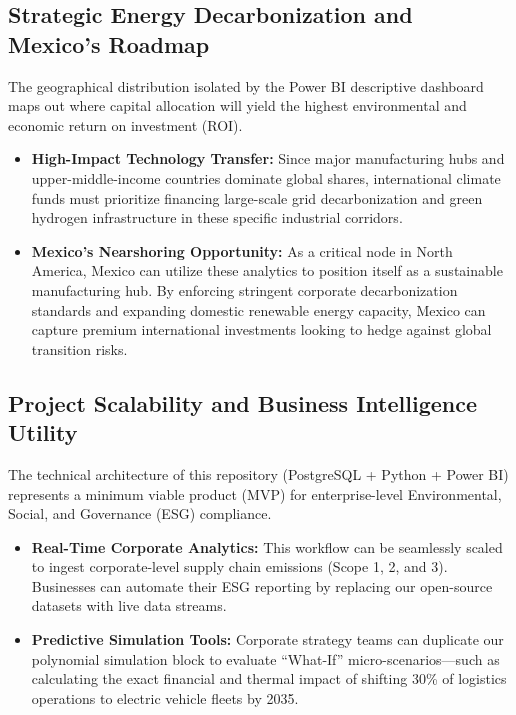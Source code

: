 \documentclass[11pt,letterpaper]{article}
\begin{document}
\subsection{Strategic Energy Decarbonization and Mexico's Roadmap}
The geographical distribution isolated by the Power BI descriptive dashboard maps out where capital allocation will yield the highest environmental and economic return on investment (ROI).
\begin{itemize}
	\item \textbf{High-Impact Technology Transfer:} Since major manufacturing hubs and upper-middle-income countries dominate global shares, international climate funds must prioritize financing large-scale grid decarbonization and green hydrogen infrastructure in these specific industrial corridors.
	\item \textbf{Mexico's Nearshoring Opportunity:} As a critical node in North America, Mexico can utilize these analytics to position itself as a sustainable manufacturing hub. By enforcing stringent corporate decarbonization standards and expanding domestic renewable energy capacity, Mexico can capture premium international investments looking to hedge against global transition risks.
\end{itemize}

\subsection{Project Scalability and Business Intelligence Utility}
The technical architecture of this repository (PostgreSQL + Python + Power BI) represents a minimum viable product (MVP) for enterprise-level Environmental, Social, and Governance (ESG) compliance.
\begin{itemize}
	\item \textbf{Real-Time Corporate Analytics:} This workflow can be seamlessly scaled to ingest corporate-level supply chain emissions (Scope 1, 2, and 3). Businesses can automate their ESG reporting by replacing our open-source datasets with live data streams.
	\item \textbf{Predictive Simulation Tools:} Corporate strategy teams can duplicate our polynomial simulation block to evaluate ``What-If'' micro-scenarios—such as calculating the exact financial and thermal impact of shifting 30\% of logistics operations to electric vehicle fleets by 2035.
\end{itemize}
\end{document}
